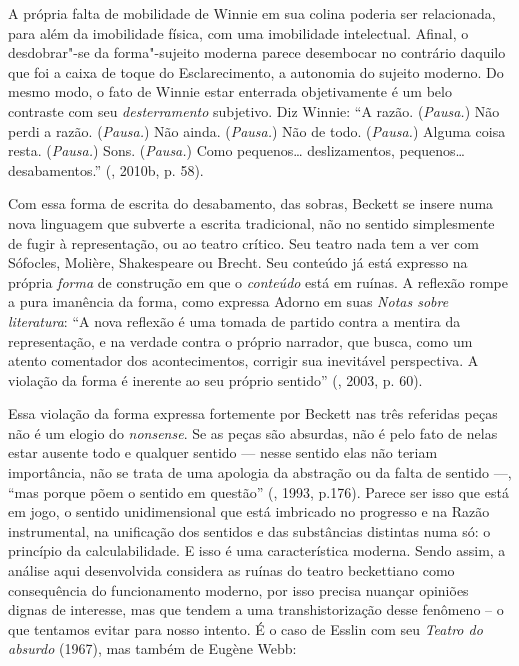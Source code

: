 A própria falta de mobilidade de Winnie em sua colina poderia ser
relacionada, para além da imobilidade física, com uma imobilidade
intelectual. Afinal, o desdobrar"-se da forma"-sujeito moderna parece
desembocar no contrário daquilo que foi a caixa de toque do
Esclarecimento, a autonomia do sujeito moderno. Do mesmo modo, o fato de
Winnie estar enterrada objetivamente é um belo contraste com seu
\emph{desterramento} subjetivo. Diz Winnie: ``A razão. (\emph{Pausa.})
Não perdi a razão. (\emph{Pausa.}) Não ainda. (\emph{Pausa.}) Não de
todo. (\emph{Pausa.}) Alguma coisa resta. (\emph{Pausa.}) Sons.
(\emph{Pausa.}) Como pequenos\ldots{} deslizamentos, pequenos\ldots{}
desabamentos.'' (, 2010b, p. 58).

Com essa forma de escrita do desabamento, das sobras, Beckett se insere
numa nova linguagem que subverte a escrita tradicional, não no sentido
simplesmente de fugir à representação, ou ao teatro crítico. Seu teatro
nada tem a ver com Sófocles, Molière, Shakespeare ou Brecht. Seu
conteúdo já está expresso na própria \emph{forma} de construção em que o
\emph{conteúdo} está em ruínas. A reflexão rompe a pura imanência da
forma, como expressa Adorno em suas \emph{Notas sobre literatura}: ``A
nova reflexão é uma tomada de partido contra a mentira da representação,
e na verdade contra o próprio narrador, que busca, como um atento
comentador dos acontecimentos, corrigir sua inevitável perspectiva. A
violação da forma é inerente ao seu próprio sentido'' (, 2003, p.
60).

Essa violação da forma expressa fortemente por Beckett nas três
referidas peças não é um elogio do \emph{nonsense}. Se as peças são
absurdas, não é pelo fato de nelas estar ausente todo e qualquer sentido
--- nesse sentido elas não teriam importância, não se trata de uma
apologia da abstração ou da falta de sentido ---, ``mas porque põem o
sentido em questão'' (, 1993, p.176). Parece ser isso que está em
jogo, o sentido unidimensional que está imbricado no progresso e na
Razão instrumental, na unificação dos sentidos e das substâncias
distintas numa só: o princípio da calculabilidade. E isso é uma
característica moderna. Sendo assim, a análise aqui desenvolvida considera as ruínas
do teatro beckettiano como consequência do funcionamento moderno, por
isso precisa nuançar opiniões dignas de interesse, mas que tendem a uma
transhistorização desse fenômeno -- o que tentamos evitar para nosso
intento. É o caso de Esslin com seu \emph{Teatro do absurdo} (1967), mas
também de Eugène Webb:

